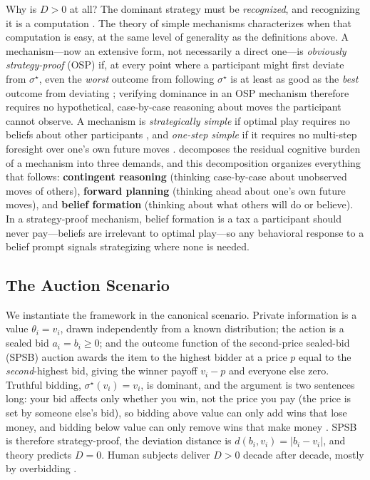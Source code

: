 Why is $D > 0$ at all? The dominant strategy must be \emph{recognized}, and recognizing it is a computation \citep{oprea2024decisions}. The theory of simple mechanisms characterizes when that computation is easy, at the same level of generality as the definitions above. A mechanism---now an extensive form, not necessarily a direct one---is \emph{obviously strategy-proof} (OSP) if, at every point where a participant might first deviate from $\sigma^{\star}$, even the \emph{worst} outcome from following $\sigma^{\star}$ is at least as good as the \emph{best} outcome from deviating \citep{li2017obviously}; verifying dominance in an OSP mechanism therefore requires no hypothetical, case-by-case reasoning about moves the participant cannot observe. A mechanism is \emph{strategically simple} if optimal play requires no beliefs about other participants \citep{borgers2019strategically}, and \emph{one-step simple} if it requires no multi-step foresight over one's own future moves \citep{pycia2023theory}. \citet{li2024designing} decomposes the residual cognitive burden of a mechanism into three demands, and this decomposition organizes everything that follows: \textbf{contingent reasoning} (thinking case-by-case about unobserved moves of others), \textbf{forward planning} (thinking ahead about one's own future moves), and \textbf{belief formation} (thinking about what others will do or believe). In a strategy-proof mechanism, belief formation is a tax a participant should never pay---beliefs are irrelevant to optimal play---so any behavioral response to a belief prompt signals strategizing where none is needed.

\subsection{The Auction Scenario}\label{sec:theory-auction}

We instantiate the framework in the canonical scenario. Private information is a value $\theta_i = v_i$, drawn independently from a known distribution; the action is a sealed bid $a_i = b_i \ge 0$; and the outcome function of the second-price sealed-bid (SPSB) auction awards the item to the highest bidder at a price $p$ equal to the \emph{second}-highest bid, giving the winner payoff $v_i - p$ and everyone else zero. Truthful bidding, $\sigma^{\star}(v_i) = v_i$, is dominant, and the argument is two sentences long: your bid affects only whether you win, not the price you pay (the price is set by someone else's bid), so bidding above value can only add wins that lose money, and bidding below value can only remove wins that make money \citep{vickrey1961counterspeculation}. SPSB is therefore strategy-proof, the deviation distance is $d(b_i, v_i) = |b_i - v_i|$, and theory predicts $D = 0$. Human subjects deliver $D > 0$ decade after decade, mostly by overbidding \citep{kagel1993independent, kagel1995individual}.

